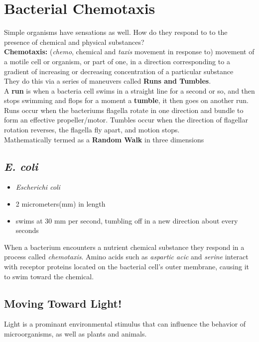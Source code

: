 \documentclass{article}
\begin{document}
\section{Bacterial Chemotaxis}
Simple organisms have sensations as well. How do they respond to to the presence of chemical and physical substances? \\

\noindent \textbf{Chemotaxis:} (\textit{chemo}, chemical and \textit{taxis} movement in response to) movement of a motile cell or organism, or part of one, in a direction corresponding to a gradient of increasing or decreasing concentration of a particular substance \\

\noindent They do this via a series of maneuvers called \textbf{Runs and Tumbles}. \\
A \textbf{run} is when a bacteria cell swims in a straight line for a second or so, and then stops swimming and flops for a moment a \textbf{tumble}, it then goes on another run. \\ 
Runs occur when the bacteriums flagella rotate in one direction and bundle to form an effective propeller/motor. Tumbles occur when the direction of flagellar rotation reverses, the flagella fly apart, and motion stops. \\
Mathematically termed as a \textbf{Random Walk} in three dimensions \\

\subsection{\textit{E. coli}}
\begin{itemize}
    \item \textit{Escherichi coli}
    \item 2 micrometers(mm) in length
    \item swims at 30 mm per second, tumbling off in a new direction about every seconds
\end{itemize}
When a bacterium encounters a nutrient chemical substance they respond in a process called \textit{chemotaxis}. Amino acids such as \textit{aspartic acic} and \textit{serine} interact with receptor proteins located on the bacterial cell's outer membrane, causing it to swim toward the chemical. \\

\subsection{Moving Toward Light!}
Light is a prominant environmental stimulus that can influence the behavior of microorganisms, as well as plants and animals. \\
\end{document}
